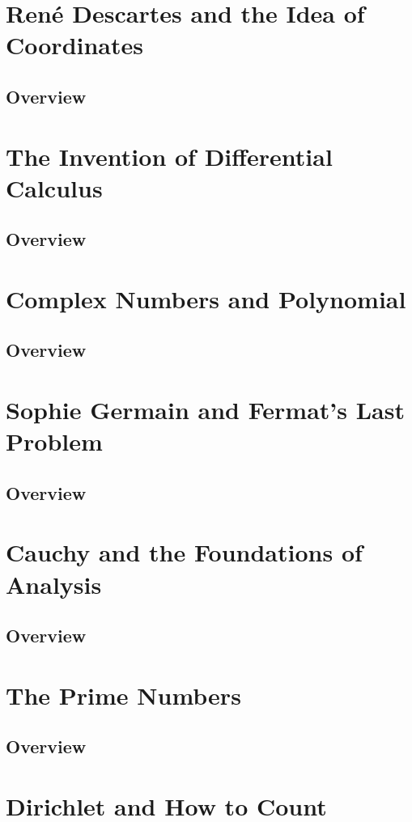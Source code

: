 \documentclass{article}
\begin{document}
\section{René Descartes and the Idea of Coordinates}
\subsection{Overview}%
\label{sub:Overview}
\section{The Invention of Differential Calculus}
\subsection{Overview}%
\label{sub:Overview}
\section{Complex Numbers and Polynomial}
\subsection{Overview}%
\label{sub:Overview}
\section{Sophie Germain and Fermat's Last Problem}
\subsection{Overview}%
\label{sub:Overview}
\section{Cauchy and the Foundations of Analysis}
\subsection{Overview}%
\label{sub:Overview}
\section{The Prime Numbers}
\subsection{Overview}%
\label{sub:Overview}
\section{Dirichlet and How to Count}
\end{document}
